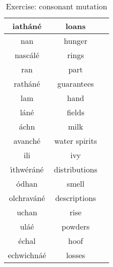 \begin{table}[H]
{\begin{tabular}{|c|c|M{10.0cm}|}
  \midrule
  iath\'{a}n\'{e} & loans & \\
  \midrule
  nan & hunger & \\
  \midrule
  nasc\'{a}l\'{e} & rings & \\
  \midrule
  ran & part & \\
  \midrule
  rath\'{a}n\'{e} & guarantees & \\
  \midrule
  lam & hand & \\
  \midrule
  l\'{a}n\'{e} & fields & \\
  \midrule
  \'{a}chn & milk & \\
  \midrule
  avanch\'{e} & water spirits & \\
  \midrule
  ili & ivy & \\
  \midrule
  \'{\i}thw\'{e}r\'{a}n\'{e} & distributions & \\
  \midrule
  \'{o}dhan & smell & \\
  \midrule
  olchrav\'{a}n\'{e} & descriptions & \\
  \midrule
  uchan & rise & \\
  \midrule
  ul\'{a}\'{e} & powders & \\
  \midrule
  \'{e}chal & hoof & \\
  \midrule
  echwichn\'{a}\'{e} & losses & \\
  \bottomrule
\end{tabular}
}
\label{exercise_consonant_mutation}
\caption{Exercise: consonant mutation}
\end{table}

\newpage
